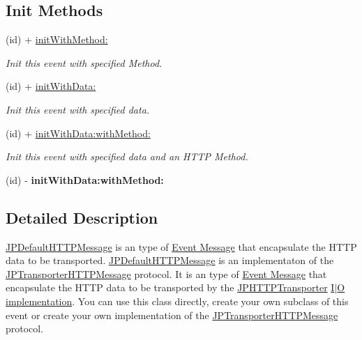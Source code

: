 \subsection*{Init Methods}
\begin{DoxyCompactItemize}
\item 
(id) + \hyperlink{a00012_a044a72fcfe95de6fe0c7885546e29d5d}{initWithMethod:}
\begin{DoxyCompactList}\small\item\em Init this event with specified Method. \item\end{DoxyCompactList}\item 
(id) + \hyperlink{a00012_a9910f12aba62760010ac09c7295c3a80}{initWithData:}
\begin{DoxyCompactList}\small\item\em Init this event with specified data. \item\end{DoxyCompactList}\item 
(id) + \hyperlink{a00012_abd503576f55ca76517961c74b99815ef}{initWithData:withMethod:}
\begin{DoxyCompactList}\small\item\em Init this event with specified data and an HTTP Method. \item\end{DoxyCompactList}\item 
\hypertarget{a00012_abd503576f55ca76517961c74b99815ef}{
(id) -\/ {\bfseries initWithData:withMethod:}}
\label{a00012_abd503576f55ca76517961c74b99815ef}

\end{DoxyCompactItemize}


\subsection{Detailed Description}
\hyperlink{a00012}{JPDefaultHTTPMessage} is an type of \hyperlink{a00006}{Event Message} that encapsulate the HTTP data to be transported. \hyperlink{a00012}{JPDefaultHTTPMessage} is an implementaton of the \hyperlink{a00040}{JPTransporterHTTPMessage} protocol. It is an type of \hyperlink{a00006}{Event Message} that encapsulate the HTTP data to be transported by the \hyperlink{a00014}{JPHTTPTransporter} \hyperlink{a00002}{I$|$O implementation}. You can use this class directly, create your own subclass of this event or create your own implementation of the \hyperlink{a00040}{JPTransporterHTTPMessage} protocol. 

